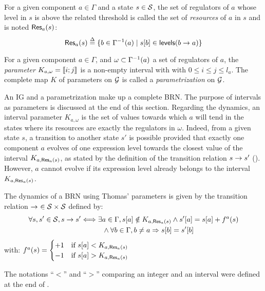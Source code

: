 \begin{definition}\label{def:resources}
For a given component $a \in \Gamma$ and a state $s \in \mathcal{S}$,
the set of regulators of $a$ whose level in $s$ is above the related threshold %
is called the set of \emph{resources} of $a$ in $s$ and is noted $\mathsf{Res}_{a}(s)$:
$$\mathsf{Res}_{a}(s) \stackrel{\Delta}= \{ b \in \Gamma^{-1}(a) \mid {s[b]} \in \mathsf{levels}(b\rightarrow a) \}$$
\end{definition}

\begin{definition}\label{def:param}
For a given component $a \in \Gamma$, and $\omega \subset \Gamma^{-1}(a)$ a set of regulators of $a$,
the \emph{parameter} $K_{a,\omega} = \llbracket i ; j \rrbracket$ is a non-empty interval with with $0 \leq i \leq j \leq l_a$.
The complete map $K$ of parameters on $\mathcal{G}$ is called a \emph{parametrization} on $\mathcal{G}$.
\end{definition}
An IG and a parametrization make up a complete BRN.
The purpose of intervals as parameters is discussed at the end of this section.
Regarding the dynamics, an interval parameter $K_{a,\omega}$ is the set of values towards which $a$ will tend
in the states where its resources are exactly the regulators in $\omega$.
Indeed, from a given state $s$, a transition to another state $s'$ is possible provided that
exactly one component $a$ evolves of one expression level towards the closest value of the interval $K_{a,\mathsf{Res}_{a}(s)}$,
as stated by the definition of the transition relation $s \rightarrow s'$ ().
However, $a$ cannot evolve if its expression level already belongs to the interval $K_{a,\mathsf{Res}_{a}(s)}$.

\begin{definition}\label{def:dynamics}
The dynamics of a BRN using Thomas' parameters is given by the transition relation $\rightarrow\ \in \mathcal{S} \times \mathcal{S}$ defined by:
\begin{align*}
  \forall s, s' \in \mathcal{S}, s \rightarrow s' &\Longleftrightarrow \exists a \in \Gamma, {s[a]} \notin K_{a, \mathsf{Res}_{a}(s)} \wedge {s'[a]} = {s[a]} + f^a(s) \\
    & \qquad\quad \wedge \forall b \in \Gamma, b \neq a \Rightarrow {s[b]} = {s'[b]}
\end{align*}
with: $f^a(s) = 
  \begin{cases}
    +1 & \text{if } {s[a]} < K_{a, \mathsf{Res}_{a}(s)} \\
    -1 & \text{if } {s[a]} > K_{a, \mathsf{Res}_{a}(s)} \\
  \end{cases}$
\end{definition}
The notations “$<$” and “$>$” comparing an integer and an interval were defined at the end of .


